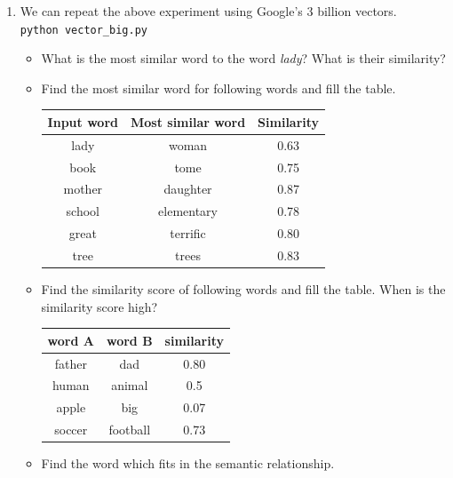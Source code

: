 \documentclass[12pt,fleqn]{article}
\begin{document}
\begin{enumerate}
\item We can repeat the above experiment using Google's 3 billion vectors. \\ 

\texttt{python vector\_big.py} \\ 

\begin{itemize} 
 \item What is the most similar word to the word \textit{lady}? What is their similarity? 
 \item Find the most similar word for following words and fill the table. 
 \begin{table}[htb!] 
  \begin{center} 
     \begin{tabular}{c|c|c}
      Input word & Most similar word & Similarity \\  \hline 
      lady & woman & 0.63\\ 
      book & tome & 0.75 \\ 
      mother & daughter & 0.87\\ 
      school & elementary & 0.78 \\ 
      great & terrific & 0.80\\ 
      tree & trees & 0.83 \\ 
     \end{tabular}
  \end{center}
\end{table}
\item Find the similarity score of following words and fill the table. When is the similarity score high? 
\begin{table}[htb!] 
   \begin{center} 
         \begin{tabular}{c|c|c}
          word A & word B & similarity \\  \hline 
          father & dad & 0.80 \\ 
          human & animal & 0.5 \\ 
          apple & big & 0.07 \\ 
          soccer & football & 0.73 \\ 
         \end{tabular}
   \end{center}
\end{table}

\item Find the word which fits in the semantic relationship.


\end{itemize}
\end{enumerate}
\end{document}
